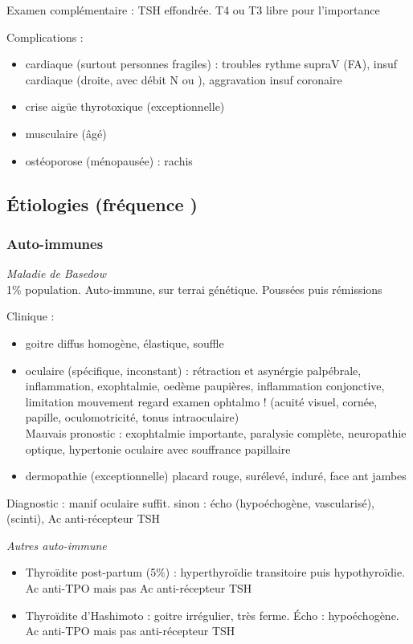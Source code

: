 \documentclass[11pt]{article}
\begin{document}
Examen complémentaire : TSH effondrée. T4 ou T3 libre pour l'importance

Complications : 
\begin{itemize}
\item cardiaque (surtout personnes fragiles) : troubles rythme supraV (FA), insuf
cardiaque (droite, avec débit N ou \inc), aggravation insuf coronaire
\item crise aigüe thyrotoxique (exceptionnelle)
\item musculaire (âgé)
\item ostéoporose (\female ménopausée) : rachis
\end{itemize}

\subsection{Étiologies (fréquence \dec)}
\label{sec:orga49b53e}
\subsubsection{Auto-immunes}
\label{sec:org8450cd7}
\emph{Maladie de Basedow}\\
1\% population. Auto-immune, sur terrai génétique. Poussées puis rémissions

Clinique : 
\begin{itemize}
\item goitre diffus homogène, élastique, souffle
\item oculaire (spécifique, inconstant) : rétraction et asynérgie palpébrale,
inflammation, exophtalmie, oedème paupières, inflammation conjonctive,
limitation mouvement regard
\thus examen ophtalmo ! (acuité visuel, cornée, papille, oculomotricité, tonus
intraoculaire)\\
Mauvais pronostic : exophtalmie importante, paralysie complète, neuropathie
optique, hypertonie oculaire avec souffrance papillaire
\item dermopathie (exceptionnelle) placard rouge, surélevé, induré, face ant jambes
\end{itemize}

Diagnostic : manif oculaire suffit. sinon : écho (hypoéchogène, vascularisé),
(scinti), Ac anti-récepteur TSH

\emph{Autres auto-immune}\\
\begin{itemize}
\item Thyroïdite post-partum (5\%) : hyperthyroïdie transitoire puis hypothyroïdie. Ac
anti-TPO mais pas Ac anti-récepteur TSH
\item Thyroïdite d'Hashimoto : goitre irrégulier, très ferme. Écho :
hypoéchogène. Ac anti-TPO mais pas anti-récepteur TSH
\end{itemize}
\end{document}
